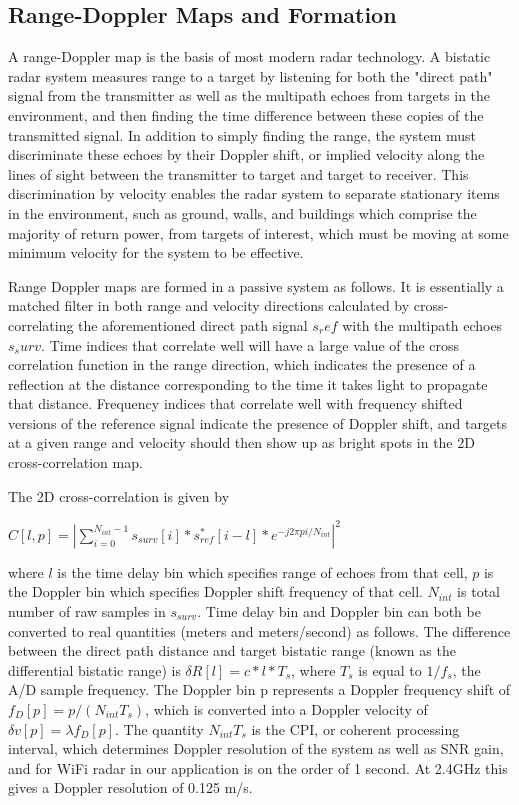 \documentclass[article,11pt,onecolumn,final]{IEEEtran}
\begin{document}
\subsection{Range-Doppler Maps and Formation}

A range-Doppler map is the basis of most modern radar technology. A bistatic radar system measures range to a target by listening for both the "direct path" signal from the transmitter as well as the multipath echoes from targets in the environment, and then finding the time difference between these copies of the transmitted signal. In addition to simply finding the range, the system must discriminate these echoes by their Doppler shift, or implied velocity along the lines of sight between the transmitter to target and target to receiver. This discrimination by velocity enables the radar system to separate stationary items in the environment, such as ground, walls, and buildings which comprise the majority of return power, from targets of interest, which must be moving at some minimum velocity for the system to be effective.

Range Doppler maps are formed in a passive system as follows. It is essentially a matched filter in both range and velocity directions calculated by cross-correlating the aforementioned direct path signal $s_ref$ with the multipath echoes $s_surv$. Time indices that correlate well will have a large value of the cross correlation function in the range direction, which indicates the presence of a reflection at the distance corresponding to the time it takes light to propagate that distance. Frequency indices that correlate well with frequency shifted versions of the reference signal indicate the presence of Doppler shift, and targets at a given range and velocity should then show up as bright spots in the 2D cross-correlation map.

The 2D cross-correlation is given by

$ C[l, p] = | \sum\limits_{i=0}^{N_{int}-1} s_{surv}[i]*s_{ref}^{*}[i - l]*e^{-j2\pi pi/N_{int}}|^2 $

where $l$ is the time delay bin which specifies range of echoes from that cell, $p$ is the Doppler bin which specifies Doppler shift frequency of that cell. $N_{int}$ is total number of raw samples in $s_{surv}$. Time delay bin and Doppler bin can both be converted to real quantities (meters and meters/second) as follows. The difference between the direct path distance and target bistatic range (known as the differential bistatic range) is $\delta R[l] = c*l*T_s$, where $T_s$ is equal to $1/f_s$, the A/D sample frequency. The Doppler bin p represents a Doppler frequency shift of $f_D[p] = p/(N_{int}T_s)$, which is converted into a Doppler velocity of $\delta v[p] = \lambda f_D[p]$. The quantity $N_{int}T_s$ is the CPI, or coherent processing interval, which determines Doppler resolution of the system as well as SNR gain, and for WiFi radar in our application is on the order of 1 second. At 2.4GHz this gives a Doppler resolution of 0.125 m/s.
\end{document}

